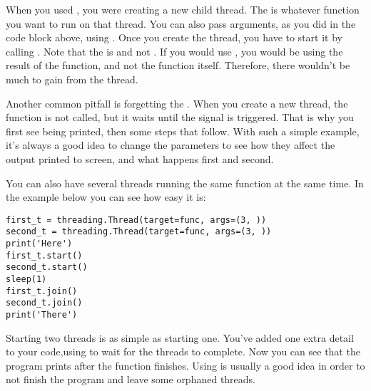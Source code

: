When you used , you were creating a new child thread. The  is whatever function you want to run on that thread. You can also pass arguments, as you did in the code block above, using . Once you create the thread, you have to start it by calling . Note that the  is  and not . If you would use , you would be using the result of the function, and not the function itself. Therefore, there wouldn't be much to gain from the thread.


Another common pitfall is forgetting the . When you create a new thread, the function is not called, but it waits until the  signal is triggered. That is why you first see  being printed, then some steps that follow. With such a simple example, it's always a good idea to change the parameters to see how they affect the output printed to screen, and what happens first and second.

You can also have several threads running the same function at the same time. In the example below you can see how easy it is:

\begin{verbatim}
first_t = threading.Thread(target=func, args=(3, ))
second_t = threading.Thread(target=func, args=(3, ))
print('Here')
first_t.start()
second_t.start()
sleep(1)
first_t.join()
second_t.join()
print('There')
\end{verbatim}

Starting two threads is as simple as starting one. You've added one extra detail to your code,using  to wait for the threads to complete. Now you can see that the program prints  after the function finishes. Using  is usually a good idea in order to not finish the program and leave some orphaned threads.


